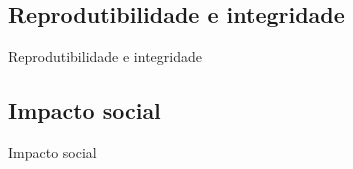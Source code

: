 \subsection{Reprodutibilidade e integridade}
\label{ss.reproducibility_integrity}

\begin{frame}{Reprodutibilidade e integridade}
\end{frame}

\subsection{Impacto social}
\label{ss.social_impact}

\begin{frame}{Impacto social}
\end{frame}

